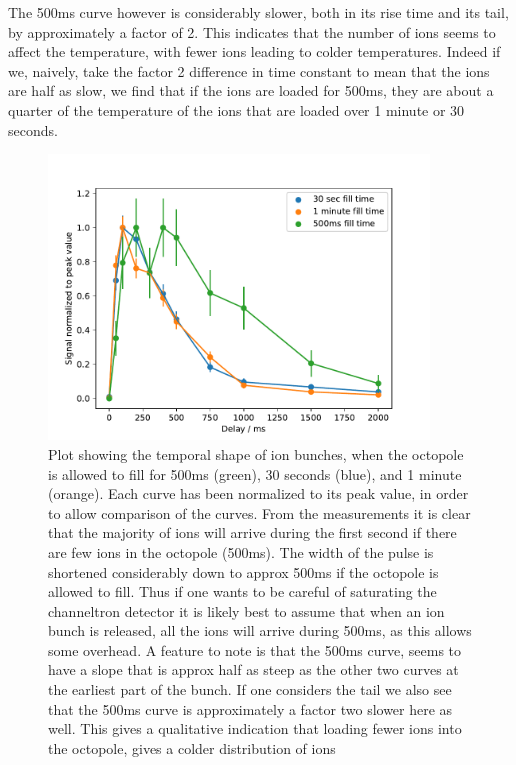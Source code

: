 The 500ms curve however is considerably slower, both in its rise time and its tail, by approximately a factor of 2. This indicates that the number of ions seems to affect the temperature, with fewer ions leading to colder temperatures.
Indeed if we, naively, take the factor 2 difference in time constant to mean that the ions are half as slow, we find that if the ions are loaded for 500ms, they are about a quarter 
of the temperature of the ions that are loaded over 1 minute or 30 seconds.
\begin{figure}[h]
    \centering
    \includegraphics[width = 0.9\textwidth]{main/chargeShape.pdf}
    \caption{Plot showing the temporal shape of ion bunches, when the octopole is allowed to fill for 500ms (green), 30 seconds (blue), and 1 minute (orange).
    Each curve has been normalized to its peak value, in order to allow comparison of the curves. From the measurements it is clear that the majority of ions will arrive during the first second if there are few ions in the octopole (500ms).
    The width of the pulse is shortened considerably down to approx 500ms if the octopole is allowed to fill. Thus if one wants to be careful of saturating the channeltron detector it is likely best to assume that when an ion bunch is released, all the ions will arrive during 500ms, as this allows some overhead.
    A feature to note is that the 500ms curve, seems to have a slope that is approx half as steep as the other two curves at the earliest part of the bunch.
    If one considers the tail we also see that the 500ms curve is approximately a factor two slower here as well. This gives a qualitative indication that loading fewer ions into the octopole, gives a colder distribution of ions}
    \label{fig:bunchShape}
\end{figure}

